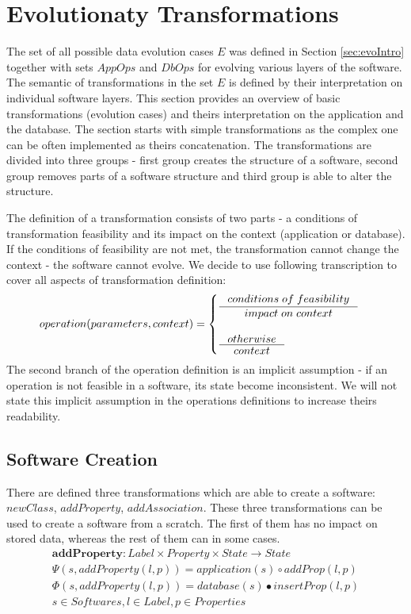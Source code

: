 \documentclass[11pt]{article}
\begin{document}
\section{Evolutionaty Transformations}
The set of all possible data evolution cases $E$ was defined in Section \ref{sec:evoIntro} together with sets $AppOps$ and $DbOps$ for evolving various layers of the software. The semantic of transformations in the set $E$ is defined by their interpretation on individual software layers. This section provides an overview of basic transformations (evolution cases) and theirs interpretation on the application and the database. The section starts with simple transformations as the complex one can be often implemented as theirs concatenation. The transformations are divided into three groups - first group creates the structure of a software, second group removes parts of a software structure and third group is able to alter the structure.

The definition of a transformation consists of two parts - a conditions of transformation feasibility and its impact on the context (application or database). If the conditions of feasibility are not met, the transformation cannot change the context - the software cannot evolve.  We decide to use following transcription to cover all aspects of transformation definition:
\begin{align*}
operation(parameters, context) = \begin{cases}
  \inference{conditions \; of \; feasibility}{impact \; on \; context}\\ \\
  \inference{otherwise}{context}
 \end{cases}
\end{align*}
The second branch of the operation definition is an implicit assumption - if an operation is not feasible in a software, its state become inconsistent. We will not state this implicit assumption in the operations definitions to increase theirs readability.


\subsection{Software Creation}
There are defined three transformations which are able to create a software: $newClass$, $addProperty$, $addAssociation$. These three transformations can be used to create a software from a scratch. The first of them has no impact on stored data, whereas the rest of them can in some cases.
\begin{align*}
\mathbf{addProperty} : Label \times Property \times State \rightarrow State \\
\Psi(s, addProperty(l, p)) = application(s) \circ addProp(l,p) \\
\Phi(s, addProperty(l, p)) = database(s) \bullet insertProp(l, p) \\
s \in Softwares, l \in Label, p \in Properties
\end{align*}
\end{document}
